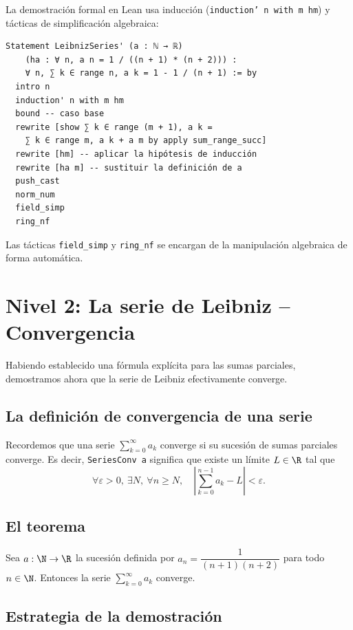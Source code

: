 La demostración formal en Lean usa inducción (\texttt{induction' n with m hm}) y tácticas de simplificación algebraica:

\begin{verbatim}
Statement LeibnizSeries' (a : ℕ → ℝ)
    (ha : ∀ n, a n = 1 / ((n + 1) * (n + 2))) :
    ∀ n, ∑ k ∈ range n, a k = 1 - 1 / (n + 1) := by
  intro n
  induction' n with m hm
  bound -- caso base
  rewrite [show ∑ k ∈ range (m + 1), a k =
    ∑ k ∈ range m, a k + a m by apply sum_range_succ]
  rewrite [hm] -- aplicar la hipótesis de inducción
  rewrite [ha m] -- sustituir la definición de a
  push_cast
  norm_num
  field_simp
  ring_nf
\end{verbatim}

Las tácticas \texttt{field\_simp} y \texttt{ring\_nf} se encargan de la manipulación algebraica de forma automática.

\section{Nivel 2: La serie de Leibniz -- Convergencia}

Habiendo establecido una fórmula explícita para las sumas parciales, demostramos ahora que la serie de Leibniz efectivamente converge.

\subsection{La definición de convergencia de una serie}

Recordemos que una serie $\sum_{k=0}^{\infty} a_k$ converge si su sucesión de sumas parciales converge. Es decir, \texttt{SeriesConv a} significa que existe un límite $L \in \R$ tal que
\[
  \forall \varepsilon > 0,\ \exists N,\ \forall n \ge N,\quad \left| \sum_{k=0}^{n-1} a_k - L \right| < \varepsilon .
\]

\subsection{El teorema}

\begin{teorema}[LeibnizSeries]
Sea $a : \N \to \R$ la sucesión definida por $a_n = \dfrac{1}{(n+1)(n+2)}$ para todo $n \in \N$. Entonces la serie $\sum_{k=0}^{\infty} a_k$ converge.
\end{teorema}

\subsection{Estrategia de la demostración}

